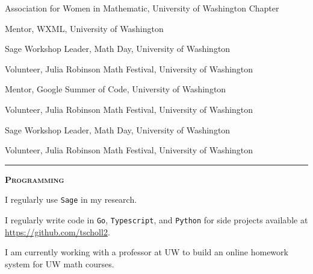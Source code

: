 \documentclass[12pt]{article}
\newcommand{\sectionheading}[1]
{
\bigskip %
\noindent
\hspace{-6.5mm}\textcolor{Gray}{\rule[.75mm]{21.5mm}{1mm}} %
\hspace{.2mm}	%
{\large{\textbf{\textsc{#1}}}} %
}
\newenvironment{date_section}
	{
	\vspace{-1ex}
	\leftmargini = 15ex
		\begin{itemize}[
			labelsep = *,
			labelwidth = 9ex,
			labelindent = 0ex,
			itemindent = !,
			font=\normalfont,
			align=parleft
		]{}
		\itemsep=-1.5mm
	}
	{\end{itemize}\vspace{-2ex}}
\newcommand{\yearmo}[2]{
	\item[
		{\makebox[1ex][r]{#1}}
		\hspace{1ex}
		{\makebox[1ex][l]{#2} }
		] }
\newcommand{\yearrange}[2]{
	\item[
		{\makebox[1ex][r]{#1}}
		--
		{\makebox[1ex][l]{#2} }
		] }
\begin{document}
		\begin{date_section}
			
			\yearrange{2015}{2017} Association for Women in Mathematic, University of Washington Chapter
			
			\yearrange{2016}{2017} %
				Mentor,
				WXML,
				University of Washington
				
			\yearmo{2017}{} %
				Sage Workshop Leader,
				Math Day,
				University of Washington
				
			\yearmo{2017}{} %
				Volunteer,
				Julia Robinson Math Festival,
				University of Washington

			\yearmo{2016}{} %
				Mentor,
				Google Summer of Code,
				University of Washington

			\yearmo{2016}{} %
				Volunteer,
				Julia Robinson Math Festival,
				University of Washington
			
			\yearmo{2016}{} %
				Sage Workshop Leader,
				Math Day,
				University of Washington

			\yearmo{2015}{}
				Volunteer,
				Julia Robinson Math Festival,
				University of Washington




		\end{date_section}


	\sectionheading{Programming}%
	
        \vspace{1ex}
        
        \noindent I regularly use {\tt Sage} in my research.
       

		\noindent I regularly write code in {\tt Go}, {\tt Typescript}, and {\tt Python} for side projects available at \url{https://github.com/tscholl2}.

		\noindent I am currently working with a professor at UW to build an online homework system for UW math courses.

\end{document}
